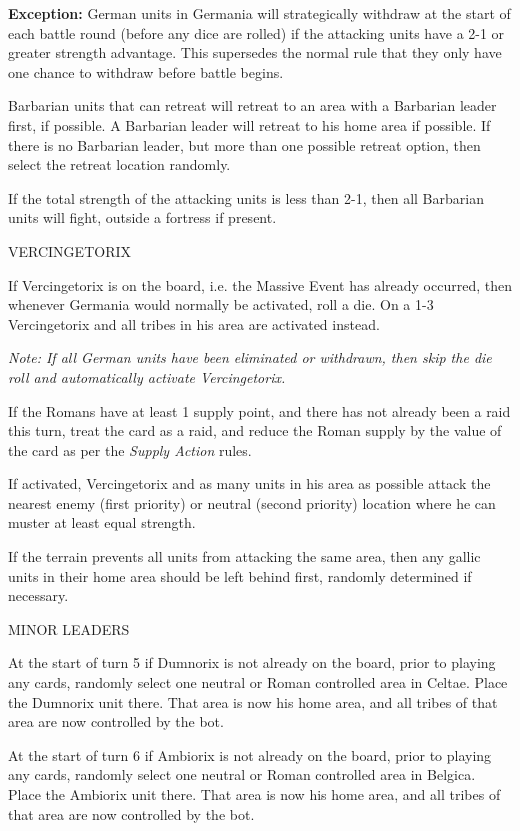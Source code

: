 \textbf{Exception:} German units in Germania will strategically withdraw at the start of each battle round (before any dice are rolled) if the attacking units have a 2-1 or greater strength advantage. This supersedes the normal rule that they only have one chance to withdraw before battle begins.

Barbarian units that can retreat will retreat to an area with a Barbarian leader first, if possible. A Barbarian leader will retreat to his home area if possible. If there is no Barbarian leader, but more than one possible retreat option, then select the retreat location randomly.

If the total strength of the attacking units is less than 2-1, then all Barbarian units will fight, outside a fortress if present.

\newpage
\label{solitaire:vercingetorix}VERCINGETORIX

If Vercingetorix is on the board, i.e. the Massive Event has already occurred, then whenever Germania would normally be activated, roll a die. On a 1-3 Vercingetorix and all tribes in his area are activated instead.

\textit{Note: If all German units have been eliminated or withdrawn, then skip the die roll and automatically activate Vercingetorix.}

If the Romans have at least 1 supply point, and there has not already been a raid this turn, treat the card as a raid, and reduce the Roman supply by the value of the card as per the \textit{Supply Action} rules.

If activated, Vercingetorix and as many units in his area as possible attack the nearest enemy (first priority) or neutral (second priority) location where he can muster at least equal strength.

If the terrain prevents all units from attacking the same area, then any gallic units in their home area should be left behind first, randomly determined if necessary.

\label{solitaire:minor_leaders}MINOR LEADERS

At the start of turn 5 if Dumnorix is not already on the board, prior to playing any cards, randomly select one neutral or Roman controlled area in Celtae. Place the Dumnorix unit there. That area is now his home area, and all tribes of that area are now controlled by the bot.

At the start of turn 6 if Ambiorix is not already on the board, prior to playing any cards, randomly select one neutral or Roman controlled area in Belgica. Place the Ambiorix unit there. That area is now his home area, and all tribes of that area are now controlled by the bot.

